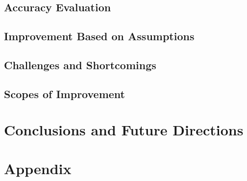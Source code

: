 \documentclass[man]{apa7}
\begin{document}
\subsection{Accuracy Evaluation}

\subsection{Improvement Based on Assumptions}

\subsection{Challenges and Shortcomings}

\subsection{Scopes of Improvement}

\section{Conclusions and Future Directions}

\section{Appendix}

\printbibliography
\end{document}
